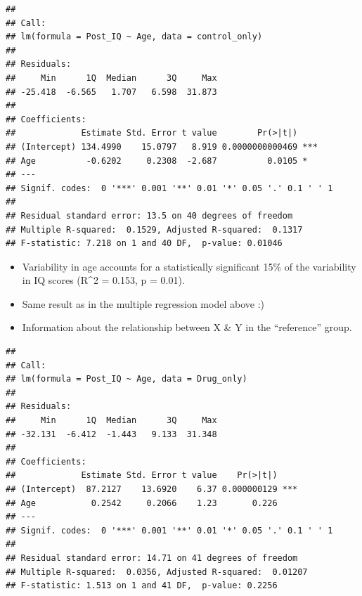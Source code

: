 \documentclass[
]{book}
\newenvironment{Shaded}{\begin{snugshade}}{\end{snugshade}}
\newcommand{\AttributeTok}[1]{\textcolor[rgb]{0.13,0.29,0.53}{#1}}
\newcommand{\DocumentationTok}[1]{\textcolor[rgb]{0.56,0.35,0.01}{\textbf{\textit{#1}}}}
\newcommand{\FunctionTok}[1]{\textcolor[rgb]{0.13,0.29,0.53}{\textbf{#1}}}
\newcommand{\NormalTok}[1]{#1}
\newcommand{\OtherTok}[1]{\textcolor[rgb]{0.56,0.35,0.01}{#1}}
\newcommand{\SpecialCharTok}[1]{\textcolor[rgb]{0.81,0.36,0.00}{\textbf{#1}}}
\newcommand{\StringTok}[1]{\textcolor[rgb]{0.31,0.60,0.02}{#1}}
\providecommand{\tightlist}{%
  \setlength{\itemsep}{0pt}\setlength{\parskip}{0pt}}
\begin{document}
\begin{verbatim}
## 
## Call:
## lm(formula = Post_IQ ~ Age, data = control_only)
## 
## Residuals:
##     Min      1Q  Median      3Q     Max 
## -25.418  -6.565   1.707   6.598  31.873 
## 
## Coefficients:
##             Estimate Std. Error t value        Pr(>|t|)    
## (Intercept) 134.4990    15.0797   8.919 0.0000000000469 ***
## Age          -0.6202     0.2308  -2.687          0.0105 *  
## ---
## Signif. codes:  0 '***' 0.001 '**' 0.01 '*' 0.05 '.' 0.1 ' ' 1
## 
## Residual standard error: 13.5 on 40 degrees of freedom
## Multiple R-squared:  0.1529, Adjusted R-squared:  0.1317 
## F-statistic: 7.218 on 1 and 40 DF,  p-value: 0.01046
\end{verbatim}

\begin{itemize}
\tightlist
\item
  Variability in age accounts for a statistically significant 15\% of the variability in IQ scores (R\^{}2 = 0.153, p = 0.01).
\item
  Same result as in the multiple regression model above :)
\item
  Information about the relationship between X \& Y in the ``reference'' group.
\end{itemize}

\begin{Shaded}
\end{Shaded}

\begin{verbatim}
## 
## Call:
## lm(formula = Post_IQ ~ Age, data = Drug_only)
## 
## Residuals:
##     Min      1Q  Median      3Q     Max 
## -32.131  -6.412  -1.443   9.133  31.348 
## 
## Coefficients:
##             Estimate Std. Error t value    Pr(>|t|)    
## (Intercept)  87.2127    13.6920    6.37 0.000000129 ***
## Age           0.2542     0.2066    1.23       0.226    
## ---
## Signif. codes:  0 '***' 0.001 '**' 0.01 '*' 0.05 '.' 0.1 ' ' 1
## 
## Residual standard error: 14.71 on 41 degrees of freedom
## Multiple R-squared:  0.0356, Adjusted R-squared:  0.01207 
## F-statistic: 1.513 on 1 and 41 DF,  p-value: 0.2256
\end{verbatim}
\end{document}
